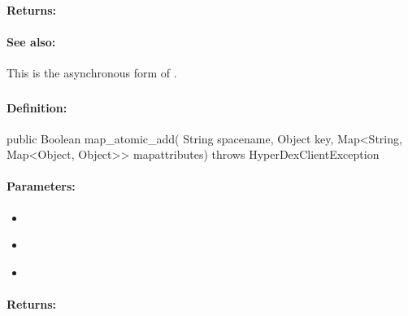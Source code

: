 \paragraph{Returns:}


\paragraph{See also:}  This is the asynchronous form of .

\pagebreak
\subsubsection{}
\label{api:java:map_atomic_add}


\paragraph{Definition:}
\begin{javacode}
public Boolean map_atomic_add(
        String spacename,
        Object key,
        Map<String, Map<Object, Object>> mapattributes) throws HyperDexClientException
\end{javacode}

\paragraph{Parameters:}
\begin{itemize}[noitemsep]
\item {}\\

\item {}\\

\item {}\\

\end{itemize}

\paragraph{Returns:}


